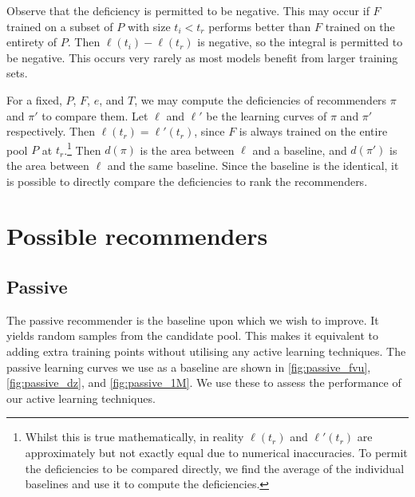 \documentclass[11pt,twoside,openright]{report}
\begin{document}
Observe that the deficiency is permitted to be negative. This may occur if $F$ trained on a subset of $P$ with size $t_i < t_r$ performs better than $F$ trained on the entirety of $P$. Then $\ell(t_i) - \ell(t_r)$ is negative, so the integral is permitted to be negative. This occurs very rarely as most models benefit from larger training sets.

For a fixed, $P$, $F$, $e$, and $T$, we may compute the deficiencies of recommenders $\pi$ and $\pi'$ to compare them. Let $\ell$ and $\ell'$ be the learning curves of $\pi$ and $\pi'$ respectively. Then $\ell(t_r) = \ell'(t_r)$, since $F$ is always trained on the entire pool $P$ at $t_r$.\footnote{Whilst this is true mathematically, in reality $\ell(t_r)$ and $\ell'(t_r)$ are approximately but not exactly equal due to numerical inaccuracies. To permit the deficiencies to be compared directly, we find the average of the individual baselines and use it to compute the deficiencies.} Then $d(\pi)$ is the area between $\ell$ and a baseline, and $d(\pi')$ is the area between $\ell$ and the same baseline. Since the baseline is the identical, it is possible to directly compare the deficiencies to rank the recommenders.

\section{Possible recommenders}

\subsection{Passive}

The passive recommender is the baseline upon which we wish to improve. It yields random samples from the candidate pool. \citep{Matt} This makes it equivalent to adding extra training points without utilising any active learning techniques. The passive learning curves we use as a baseline are shown in \cref{fig:passive_fvu}, \cref{fig:passive_dz}, and \cref{fig:passive_1M}. We use these to assess the performance of our active learning techniques.
\end{document}
